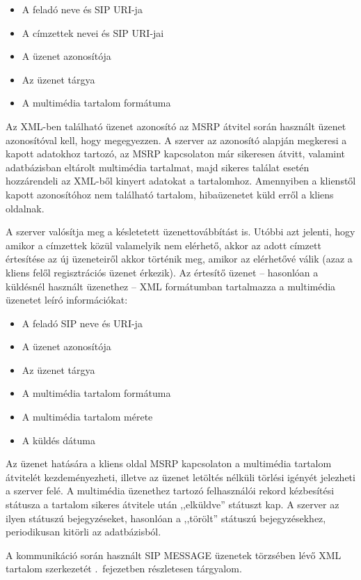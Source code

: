 \begin{itemize}\itemsep1pt
\item	A feladó neve és SIP URI-ja
\item A címzettek nevei és SIP URI-jai
\item A üzenet azonosítója
\item Az üzenet tárgya
\item A multimédia tartalom formátuma
\end{itemize}

Az XML-ben található üzenet azonosító az MSRP átvitel során használt üzenet azonosítóval kell, hogy megegyezzen. A szerver az azonosító alapján megkeresi a kapott adatokhoz tartozó, az MSRP kapcsolaton már sikeresen átvitt, valamint adatbázisban eltárolt multimédia tartalmat, majd sikeres találat esetén hozzárendeli az XML-ből kinyert adatokat a tartalomhoz. Amennyiben a klienstől kapott azonosítóhoz nem található tartalom, hibaüzenetet küld erről a kliens oldalnak.

A szerver valósítja meg a késletetett üzenettovábbítást is. Utóbbi azt jelenti, hogy amikor a címzettek közül valamelyik nem elérhető, akkor az adott címzett értesítése az új üzeneteiről akkor történik meg, amikor az elérhetővé válik (azaz a kliens felől regisztrációs üzenet érkezik). Az értesítő üzenet -- hasonlóan a küldésnél használt üzenethez -- XML formátumban tartalmazza a multimédia üzenetet leíró információkat:

\begin{itemize}\itemsep1pt
\item	A feladó SIP neve és URI-ja
\item A üzenet azonosítója
\item Az üzenet tárgya
\item A multimédia tartalom formátuma
\item A multimédia tartalom mérete
\item A küldés dátuma
\end{itemize}

Az üzenet hatására a kliens oldal MSRP kapcsolaton a multimédia tartalom átvitelét kezdeményezheti, illetve az üzenet letöltés nélküli törlési igényét jelezheti a szerver felé. A multimédia üzenethez tartozó felhasználói rekord kézbesítési státusza a tartalom sikeres átvitele után ,,elküldve'' státuszt kap. A szerver az ilyen státuszú bejegyzéseket, hasonlóan a ,,törölt'' státuszú bejegyzésekhez, periodikusan kitörli az adatbázisból. 

A kommunikáció során használt SIP MESSAGE üzenetek törzsében lévő XML tartalom szerkezetét .~fejezetben részletesen tárgyalom.

